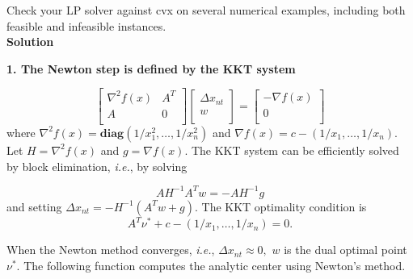 \documentclass{article}
\begin{document}
Check your LP solver against cvx on several numerical examples, including both feasible and infeasible instances.\\

\textbf{Solution}

\textbf{1. The Newton step is defined by the KKT system}

$$
\begin{bmatrix} 
	\nabla ^2 f(x) & A^T \\
	A & 0\\
\end{bmatrix}
\begin{bmatrix} 
	\Delta x_{nt} \\
	w\\
\end{bmatrix} =
\begin{bmatrix} 
	- \nabla f(x) \\
	0\\
\end{bmatrix}
$$
where 
$\nabla ^2 f(x) = \mathbf{diag}(1/x_1^2, \dots, 1/x_n^2)$ 
and
$\nabla f(x) = c - (1/x_1, \dots, 1/x_n).$
Let $H = \nabla ^2 f(x)$ and $g = \nabla f(x).$
The KKT system can be efficiently solved by block elimination, \textit{i.e.}, by solving 

$$
A H^{-1}A^T w = - AH^{-1}g
$$
and setting $\Delta x_{nt} = - H^{-1}(A^Tw + g).$
The KKT optimality condition is 
$$
A^T \nu^* + c - (1/x_1, \dots, 1/x_n) = 0.
$$

When the Newton method converges, \textit{i.e.}, 
$\Delta x_{nt} \approx 0,$ $w$ is the dual optimal point $\nu^*.$
The following function computes the analytic center using Newton’s method. 
\end{document}
